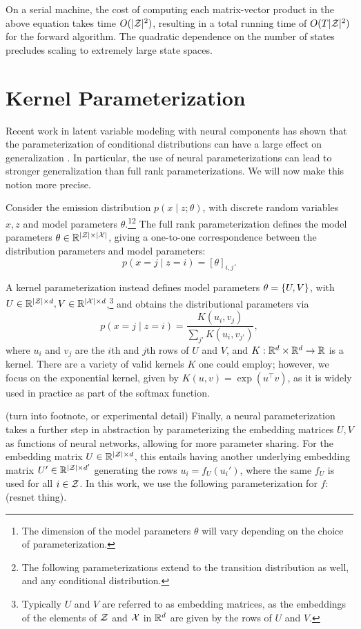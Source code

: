 \documentclass{article}
\begin{document}
On a serial machine, the cost of computing each matrix-vector product in
the above equation takes time $O(|\mathcal{Z}|^2)$, resulting in a total
running time of $O(T|\mathcal{Z}|^2)$ for the forward algorithm.
The quadratic dependence on the number of states precludes
scaling to extremely large state spaces.

\section{Kernel Parameterization}
Recent work in latent variable modeling with neural components has shown
that the parameterization of conditional distributions can have a large
effect on generalization \citep{kim2019cpcfg}. 
In particular, the use of neural parameterizations can lead to stronger
generalization than full rank parameterizations.
We will now make this notion more precise.

Consider the emission distribution $p(x \mid z; \theta)$,
with discrete random variables $x,z$ and model parameters $\theta$.\footnote{
The dimension of the model parameters $\theta$ will vary depending on the choice
of parameterization.}\footnote{
The following parameterizations extend to the transition distribution as well,
and any conditional distribution.}
The full rank parameterization defines the model parameters $\theta\in\mathbb{R}^{|\mathcal{Z}|\times|\mathcal{X}|}$,
giving a one-to-one correspondence between the distribution parameters and model parameters:
$$p(x=j \mid z=i) = [\theta]_{i,j}.$$

A kernel parameterization instead defines model parameters $\theta = \left\{U,V\right\}$,
with $U\in\mathbb{R}^{|\mathcal{Z}|\times d},V\in\mathbb{R}^{|\mathcal{X}|\times d}$,\footnote{
Typically $U$ and $V$ are referred to as embedding matrices,
as the embeddings of the elements of $\mathcal{Z}$ and $\mathcal{X}$ in $\mathbb{R}^d$ are given by 
the rows of $U$ and $V$.
} and obtains the distributional
parameters via
$$p(x=j \mid z=i) = \frac{K(u_i, v_j)}{\sum_{j'} K(u_i, v_{j'})},$$
where $u_i$ and $v_j$ are the $i$th and $j$th rows of $U$ and $V$,
and $K: \mathbb{R}^d \times \mathbb{R}^d \to \mathbb{R}$ is a kernel.
There are a variety of valid kernels $K$ one could employ;
however, we focus on the exponential kernel, given by $K(u, v) = \exp(u^\top v)$,
as it is widely used in practice as part of the softmax function.

(turn into footnote, or experimental detail)
Finally, a neural parameterization takes a further step in abstraction by
parameterizing the embedding matrices $U,V$ as functions of neural networks,
allowing for more parameter sharing.
For the embedding matrix $U\in\mathbb{R}^{|\mathcal{Z}|\times d}$,
this entails having another underlying embedding matrix $U'\in\mathbb{R}^{|\mathcal{Z}| \times d'}$
generating the rows $u_i = f_U(u_i')$, where the same $f_U$ is used for all $i \in \mathcal{Z}$.
In this work, we use the following parameterization for $f$:
(resnet thing).
\end{document}
